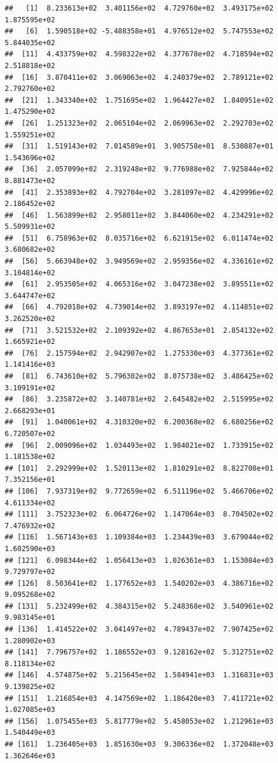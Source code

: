 \documentclass[
]{article}
\begin{document}
\begin{verbatim}
##   [1]  8.233613e+02  3.401156e+02  4.729760e+02  3.493175e+02  1.875595e+02
##   [6]  1.590518e+02 -5.488358e+01  4.976512e+02  5.747553e+02  5.844035e+02
##  [11]  4.433759e+02  4.598322e+02  4.377678e+02  4.718594e+02  2.518818e+02
##  [16]  3.870411e+02  3.069063e+02  4.240379e+02  2.789121e+02  2.792760e+02
##  [21]  1.343340e+02  1.751695e+02  1.964427e+02  1.840951e+02  1.475290e+02
##  [26]  1.251323e+02  2.065104e+02  2.069963e+02  2.292703e+02  1.559251e+02
##  [31]  1.519143e+02  7.014589e+01  3.905758e+01  8.530887e+01  1.543696e+02
##  [36]  2.057099e+02  2.319248e+02  9.776988e+02  7.925844e+02  8.881473e+02
##  [41]  2.353893e+02  4.792704e+02  3.281097e+02  4.429996e+02  2.186452e+02
##  [46]  1.563899e+02  2.958011e+02  3.844060e+02  4.234291e+02  5.509931e+02
##  [51]  6.758963e+02  8.035716e+02  6.621915e+02  6.011474e+02  3.680682e+02
##  [56]  5.663948e+02  3.949569e+02  2.959356e+02  4.336161e+02  3.104814e+02
##  [61]  2.953505e+02  4.065316e+02  3.047238e+02  3.895511e+02  3.644747e+02
##  [66]  4.792018e+02  4.739014e+02  3.893197e+02  4.114851e+02  3.262520e+02
##  [71]  3.521532e+02  2.109392e+02  4.867653e+01  2.854132e+02  1.665921e+02
##  [76]  2.157594e+02  2.942907e+02  1.275330e+03  4.377361e+02  1.141416e+03
##  [81]  6.743610e+02  5.796302e+02  8.075738e+02  3.486425e+02  3.109191e+02
##  [86]  3.235872e+02  3.140781e+02  2.645482e+02  2.515995e+02  2.668293e+01
##  [91]  1.040061e+02  4.310320e+02  6.200368e+02  6.680256e+02  6.720507e+02
##  [96]  2.009096e+02  1.034493e+02  1.984021e+02  1.733915e+02  1.181538e+02
## [101]  2.292999e+02  1.520113e+02  1.810291e+02  8.822708e+01  7.352156e+01
## [106]  7.937319e+02  9.772659e+02  6.511196e+02  5.466706e+02  4.611334e+02
## [111]  3.752323e+02  6.064726e+02  1.147064e+03  8.704502e+02  7.476932e+02
## [116]  1.567143e+03  1.109384e+03  1.234439e+03  3.679044e+02  1.602590e+03
## [121]  6.098344e+02  1.056413e+03  1.026361e+03  1.153084e+03  9.729797e+02
## [126]  8.503641e+02  1.177652e+03  1.540202e+03  4.386716e+02  9.095268e+02
## [131]  5.232499e+02  4.384315e+02  5.248368e+02  3.540961e+02  9.983145e+01
## [136]  1.414522e+02  3.041497e+02  4.789437e+02  7.907425e+02  1.280902e+03
## [141]  7.796757e+02  1.186552e+03  9.128162e+02  5.312751e+02  8.118134e+02
## [146]  4.574875e+02  5.215645e+02  1.584941e+03  1.316831e+03  9.139825e+02
## [151]  1.216854e+03  4.147569e+02  1.186420e+03  7.411721e+02  1.027085e+03
## [156]  1.075455e+03  5.817779e+02  5.458053e+02  1.212961e+03  1.540449e+03
## [161]  1.236405e+03  1.851630e+03  9.306336e+02  1.372048e+03  1.362646e+03

\end{verbatim}
\end{document}
